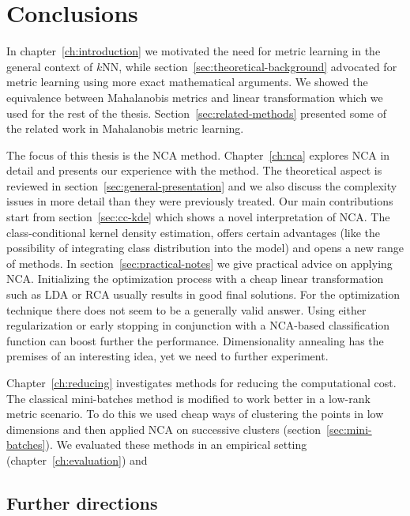 \chapter{Conclusions}
\label{ch:conclusions}
 
In chapter~\ref{ch:introduction} we motivated the need for metric learning in the general context of $k$NN, while section~\ref{sec:theoretical-background} advocated for metric learning using more exact mathematical arguments. We showed the equivalence between Mahalanobis metrics and linear transformation which we used for the rest of the thesis. Section~\ref{sec:related-methods} presented some of the related work in Mahalanobis metric learning.

The focus of this thesis is the NCA method. Chapter~\ref{ch:nca} explores NCA in detail and presents our experience with the method. The theoretical aspect is reviewed in section~\ref{sec:general-presentation} and we also discuss the complexity issues in more detail than they were previously treated. Our main contributions start from section~\ref{sec:cc-kde} which shows a novel interpretation of NCA\@. The class-conditional kernel density estimation, offers certain advantages (like the possibility of integrating class distribution into the model) and opens a new range of methods. In section~\ref{sec:practical-notes} we give practical advice on applying NCA.  Initializing the optimization process with a cheap linear transformation such as LDA or RCA usually results in good final solutions. For the optimization technique there does not seem to be a generally valid answer. Using either regularization or early stopping in conjunction with a NCA-based classification function can boost further the performance. Dimensionality annealing has the premises of an interesting idea, yet we need to further experiment.

Chapter~\ref{ch:reducing} investigates methods for reducing the computational cost. The classical mini-batches method is modified to work better in a low-rank metric scenario. To do this we used cheap ways of clustering the points in low dimensions and then applied NCA on successive clusters (section~\ref{sec:mini-batches}). We evaluated these methods in an empirical setting (chapter~\ref{ch:evaluation}) and 

\section{Further directions}
\label{sec:further-directions}


